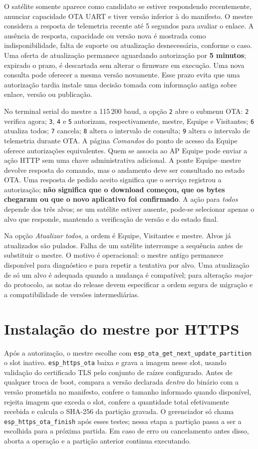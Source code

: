 O satélite somente aparece como candidato se estiver respondendo recentemente, anunciar capacidade OTA UART e tiver versão inferior à do manifesto. O mestre considera a resposta de telemetria recente até 5 segundos para avaliar o enlace. A ausência de resposta, capacidade ou versão nova é mostrada como indisponibilidade, falta de suporte ou atualização desnecessária, conforme o caso. Uma oferta de atualização permanece aguardando autorização por \textbf{5 minutos}; expirado o prazo, é descartada sem alterar o firmware em execução. Uma nova consulta pode oferecer a mesma versão novamente. Esse prazo evita que uma autorização tardia instale uma decisão tomada com informação antiga sobre enlace, versão ou publicação.

No terminal serial do mestre a 115\,200 baud, a opção \texttt{2} abre o submenu OTA: \texttt{2} verifica agora; \texttt{3}, \texttt{4} e \texttt{5} autorizam, respectivamente, mestre, Equipe e Visitantes; \texttt{6} atualiza todos; \texttt{7} cancela; \texttt{8} altera o intervalo de consulta; \texttt{9} altera o intervalo de telemetria durante OTA. A página \emph{Comandos} do ponto de acesso da Equipe oferece autorizações equivalentes. Quem se associa ao AP Equipe pode enviar a ação HTTP sem uma chave administrativa adicional. A ponte Equipe--mestre devolve resposta do comando, mas o andamento deve ser consultado no estado OTA. Uma resposta de pedido aceito significa que o serviço registrou a autorização; \textbf{não significa que o download começou, que os bytes chegaram ou que o novo aplicativo foi confirmado}. A ação para \emph{todos} depende dos três alvos; se um satélite estiver ausente, pode-se selecionar apenas o alvo que responde, mantendo a verificação de versão e do estado final.

Na opção \emph{Atualizar todos}, a ordem é Equipe, Visitantes e mestre. Alvos já atualizados são pulados. Falha de um satélite interrompe a sequência antes de substituir o mestre. O motivo é operacional: o mestre antigo permanece disponível para diagnóstico e para repetir a tentativa por alvo. Uma atualização de só um alvo é adequada quando a mudança é compatível; para alteração \emph{major} do protocolo, as notas do release devem especificar a ordem segura de migração e a compatibilidade de versões intermediárias.

\section{Instalação do mestre por HTTPS}
Após a autorização, o mestre escolhe com \texttt{esp\_ota\_get\_next\_update\_partition} o slot inativo. \texttt{esp\_https\_ota} baixa e grava a imagem nesse slot, usando validação do certificado TLS pelo conjunto de raízes configurado. Antes de qualquer troca de boot, compara a versão declarada \emph{dentro} do binário com a versão prometida no manifesto, confere o tamanho informado quando disponível, rejeita imagem que exceda o slot, confere a quantidade total efetivamente recebida e calcula o SHA-256 da partição gravada. O gerenciador só chama \texttt{esp\_https\_ota\_finish} após esses testes; nessa etapa a partição passa a ser a escolhida para a próxima partida. Em caso de erro ou cancelamento antes disso, aborta a operação e a partição anterior continua executando.

